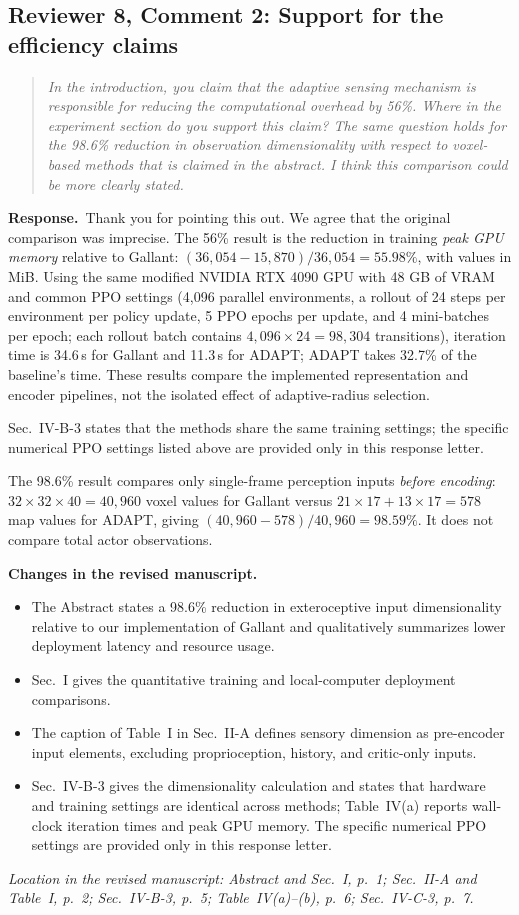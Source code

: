 \documentclass[11pt]{article}
\newenvironment{reviewcomment}{\begin{quote}\color{reviewblue}\itshape}{\end{quote}}
\newcommand{\Response}{\par\noindent\textbf{Response.}\ }
\newcommand{\Changes}{\par\noindent\textbf{Changes in the revised manuscript.}\ }
\newcommand{\Location}[1]{\par\noindent\textit{Location in the revised manuscript: #1}}
\begin{document}
\subsection*{Reviewer 8, Comment 2: Support for the efficiency claims}
\begin{reviewcomment}
In the introduction, you claim that the adaptive sensing mechanism is responsible for reducing the computational overhead by 56\%. Where in the experiment section do you support this claim? The same question holds for the 98.6\% reduction in observation dimensionality with respect to voxel-based methods that is claimed in the abstract. I think this comparison could be more clearly stated.
\end{reviewcomment}
\Response Thank you for pointing this out. We agree that the original comparison was imprecise. The 56\% result is the reduction in training \emph{peak GPU memory} relative to Gallant: $(36{,}054-15{,}870)/36{,}054=55.98\%$, with values in MiB. Using the same modified NVIDIA RTX 4090 GPU with 48 GB of VRAM and common PPO settings (4,096 parallel environments, a rollout of 24 steps per environment per policy update, 5 PPO epochs per update, and 4 mini-batches per epoch; each rollout batch contains $4{,}096\times24=98{,}304$ transitions), iteration time is 34.6\,s for Gallant and 11.3\,s for ADAPT; ADAPT takes 32.7\% of the baseline's time. These results compare the implemented representation and encoder pipelines, not the isolated effect of adaptive-radius selection.

Sec.~IV-B-3 states that the methods share the same training settings; the specific numerical PPO settings listed above are provided only in this response letter.

The 98.6\% result compares only single-frame perception inputs \emph{before encoding}: $32\times32\times40=40{,}960$ voxel values for Gallant versus $21\times17+13\times17=578$ map values for ADAPT, giving $(40{,}960-578)/40{,}960=98.59\%$. It does not compare total actor observations.
\Changes
\begin{itemize}
    \item The Abstract states a 98.6\% reduction in exteroceptive input dimensionality relative to our implementation of Gallant and qualitatively summarizes lower deployment latency and resource usage.
    \item Sec.~I gives the quantitative training and local-computer deployment comparisons.
    \item The caption of Table~I in Sec.~II-A defines sensory dimension as pre-encoder input elements, excluding proprioception, history, and critic-only inputs.
    \item Sec.~IV-B-3 gives the dimensionality calculation and states that hardware and training settings are identical across methods; Table~IV(a) reports wall-clock iteration times and peak GPU memory. The specific numerical PPO settings are provided only in this response letter.
\end{itemize}
\Location{Abstract and Sec.~I, p.~1; Sec.~II-A and Table~I, p.~2; Sec.~IV-B-3, p.~5; Table~IV(a)--(b), p.~6; Sec.~IV-C-3, p.~7.}
\end{document}
